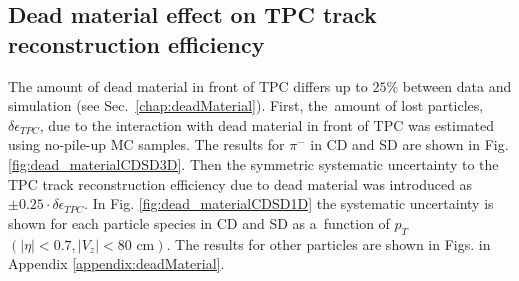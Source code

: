 \subsection{Dead material effect on TPC track reconstruction efficiency}\label{sec:deadMaterialSystematics}
The amount of dead material in front of TPC differs up to $25\%$ between data and simulation (see Sec.~\ref{chap:deadMaterial}). First, the~amount of lost particles, $\delta\epsilon_{ TPC}$, due to the interaction with dead material in front of TPC was estimated using  no-pile-up  MC samples. The results for $\pi^-$ in CD and SD are shown in Fig. \ref{fig:dead_materialCDSD3D}. Then the symmetric systematic uncertainty to the TPC track reconstruction efficiency due to dead material was introduced as $\pm 0.25 \cdot\delta\epsilon_{ TPC}$.
In Fig. \ref{fig:dead_materialCDSD1D}  the systematic uncertainty is shown for each particle species in CD and SD as a~function of $p_T$ $\left(|\eta|<0.7, |V_{z}|<80 \text{ cm}\right)$. 
The results for other particles are shown in Figs. in Appendix \ref{appendix:deadMaterial}.
